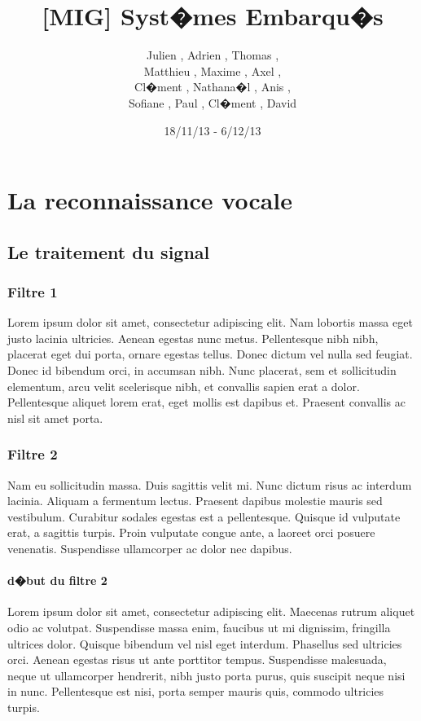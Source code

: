 \documentclass[a4paper,12pt]{report} %
\title{[MIG] Syst�mes Embarqu�s}
\author{Julien \bsc{Caillard}, Adrien \bsc{De La Vaissi�re}, Thomas \bsc{Debarre},\\ Matthieu \bsc{Denoux}, Maxime \bsc{Ernoult}, Axel \bsc{Goering},\\ Cl�ment \bsc{Joudet}, Nathana�l \bsc{Kasriel}, Anis \bsc{Khlif},\\ Sofiane \bsc{Mahiou}, Paul \bsc{Musti�re}, Cl�ment \bsc{Roig}, David \bsc{Vitoux}}
\date{18/11/13 - 6/12/13}
\begin{document}
\maketitle
\tableofcontents

\part{La reconnaissance vocale}
    \chapter{Le traitement du signal}
        \section{Filtre 1}
        	Lorem ipsum dolor sit amet\cite{ref1}, consectetur adipiscing elit. Nam lobortis massa eget justo lacinia ultricies. Aenean egestas nunc metus. Pellentesque nibh nibh, placerat eget dui porta, ornare egestas tellus. Donec dictum vel nulla sed feugiat. Donec id bibendum orci, in accumsan nibh. Nunc placerat, sem et sollicitudin elementum, arcu velit scelerisque nibh, et convallis sapien erat a dolor. Pellentesque aliquet lorem erat, eget mollis est dapibus et. Praesent convallis ac nisl sit amet porta.
        \section{Filtre 2}
        	Nam eu sollicitudin massa. Duis sagittis velit mi. Nunc dictum risus ac interdum lacinia\cite{ref2}. Aliquam a fermentum lectus. Praesent dapibus molestie mauris sed vestibulum. Curabitur sodales egestas est a pellentesque. Quisque id vulputate erat, a sagittis turpis. Proin vulputate congue ante, a laoreet orci posuere venenatis. Suspendisse ullamcorper ac dolor nec dapibus.
        \subsection{d�but du filtre 2}
        	Lorem ipsum dolor sit amet, consectetur adipiscing elit. Maecenas rutrum aliquet odio ac volutpat. Suspendisse massa enim, faucibus ut mi dignissim, fringilla ultrices dolor. Quisque bibendum vel nisl eget interdum. Phasellus sed ultricies orci. Aenean egestas risus ut ante porttitor tempus. Suspendisse malesuada, neque ut ullamcorper hendrerit, nibh justo porta purus, quis suscipit neque nisi in nunc. Pellentesque est nisi, porta semper mauris quis, commodo ultricies turpis.
\end{document}
